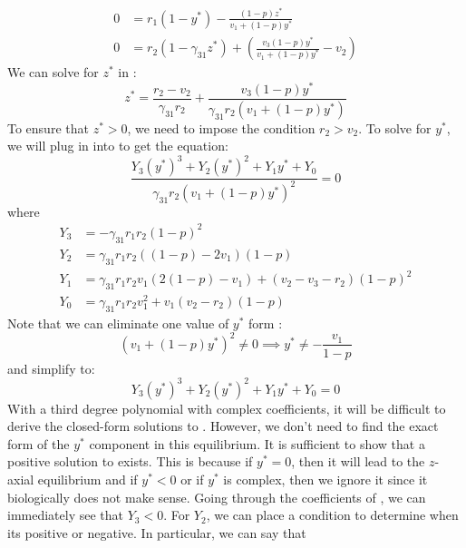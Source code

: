 \begin{subequations}
    \begin{align}
        0 &= r_1\left(1-y^*\right)-\frac{\left(1-p\right)z^*}{v_1+\left(1-p\right)y^*}
        \label{eq:4.15a}\\
        0 &= r_2\left(1-\gamma_{31}z^*\right)+\left(\frac{v_3\left(1-p\right)y^*}{v_1+\left(1-p\right)y^*}-v_2\right)
        \label{eq:4.15b}
    \end{align}
    \label{eq:4.15}
\end{subequations}
We can solve for $z^*$ in :
\begin{equation}
    z^*=\frac{r_2-v_2}{\gamma_{31}r_2}+\frac{v_3\left(1-p\right)y^*}{\gamma_{31}r_2\left(v_1+\left(1-p\right)y^*\right)}
    \label{eq:4.16}
\end{equation}
To ensure that $z^*>0$, we need to impose the condition $r_2>v_2$. To solve for $y^*$, we will plug in  into  to get the equation:
\begin{equation}
    \frac{Y_3\left(y^*\right)^3+Y_2\left(y^*\right)^2+Y_1y^*+Y_0}{\gamma_{31}r_2\left(v_1+\left(1-p\right)y^*\right)^2}=0
    \label{eq:4.17}
\end{equation}
where
\begin{align*}
    Y_3 &= -\gamma_{31}r_1r_2\left(1-p\right)^2\\
    Y_2 &= \gamma_{31}r_1r_2\left(\left(1-p\right)-2v_1\right)\left(1-p\right)\\
    Y_1 &= \gamma_{31}r_1r_2v_1\left(2\left(1-p\right)-v_1\right)+\left(v_2-v_3-r_2\right)\left(1-p\right)^2\\
    Y_0 &= \gamma_{31}r_1r_2v_1^2+v_1\left(v_2-r_2\right)\left(1-p\right)
\end{align*}
Note that we can eliminate one value of $y^*$ form :
\[
\left(v_1+\left(1-p\right)y^*\right)^2\neq0 \implies y^*\neq-\frac{v_1}{1-p}
\]
and simplify  to:
\begin{equation}
    Y_3\left(y^*\right)^3+Y_2\left(y^*\right)^2+Y_1y^*+Y_0=0
    \label{eq:4.18}
\end{equation}
With a third degree polynomial with complex coefficients, it will be difficult to derive the closed-form solutions to . However, we don't need to find the exact form of the $y^*$ component in this equilibrium. It is sufficient to show that a positive solution to  exists. This is because if $y^*=0$, then it will lead to the $z$-axial equilibrium and if $y^*<0$ or if $y^*$ is complex, then we ignore it since it biologically does not make sense. Going through the coefficients of , we can immediately see that $Y_3<0$. For $Y_2$, we can place a condition to determine when its positive or negative. In particular, we can say that
